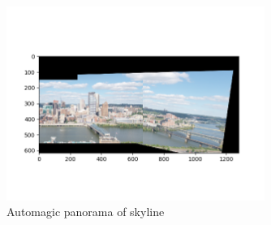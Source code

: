 \documentclass[12pt]{article}
\begin{document}
\begin{figure}[H]
\centering
\includegraphics[page=1,width=0.75\textwidth]{q4_3}
\caption{ Automagic panorama of skyline}
\label{fig:q4_3}
\end{figure}   
\end{document}
